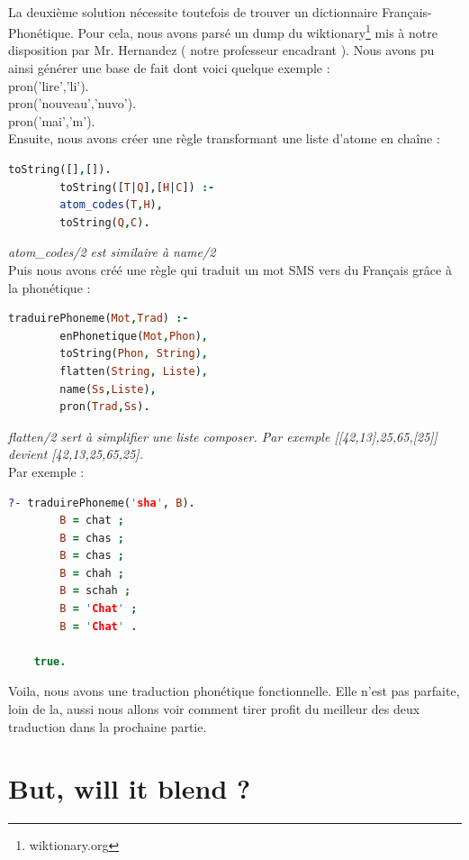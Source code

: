 \documentclass[11pt]{book}
\begin{document}
	\paragraph{}
	La deuxième solution nécessite toutefois de trouver un dictionnaire Français-Phonétique. Pour cela, nous avons parsé un dump du wiktionary\footnote{wiktionary.org} mis à notre disposition par Mr. Hernandez ( notre professeur encadrant ).
	Nous avons pu ainsi générer une base de fait dont voici quelque exemple :\\
	
	\indent pron('lire','li').\\
	\indent pron('nouveau','nuvo').\\
	\indent pron('mai','m').\\
	
	Ensuite, nous avons créer une règle transformant une liste d'atome en chaîne :
	\begin{lstlisting}[language=Prolog]
	toString([],[]).
		toString([T|Q],[H|C]) :-
		atom_codes(T,H),
		toString(Q,C).
	\end{lstlisting}
	
	{\em atom\_codes/2 est similaire à name/2}\\
	
	Puis nous avons créé une règle qui traduit un mot SMS vers du Français grâce à la phonétique :
	\begin{lstlisting}[language=Prolog]
	traduirePhoneme(Mot,Trad) :-
		enPhonetique(Mot,Phon),
		toString(Phon, String),
		flatten(String, Liste),
		name(Ss,Liste),
		pron(Trad,Ss).
	\end{lstlisting}
	
	{\em flatten/2 sert à simplifier une liste composer. Par exemple [[42,13],25,65,[25]] devient [42,13,25,65,25].}\\
	
	Par exemple :
	\begin{lstlisting}[language=Prolog]
	?- traduirePhoneme('sha', B).
		B = chat ;
		B = chas ;
		B = chas ;
		B = chah ;
		B = schah ;
		B = 'Chat' ;
		B = 'Chat' .
		
	true.
	\end{lstlisting}
	
	Voila, nous avons une traduction phonétique fonctionnelle. Elle n'est pas parfaite, loin de la, aussi nous allons voir comment tirer profit du meilleur des deux traduction dans la prochaine partie.
	
	\section{But, will it blend ?}
	
\end{document}
